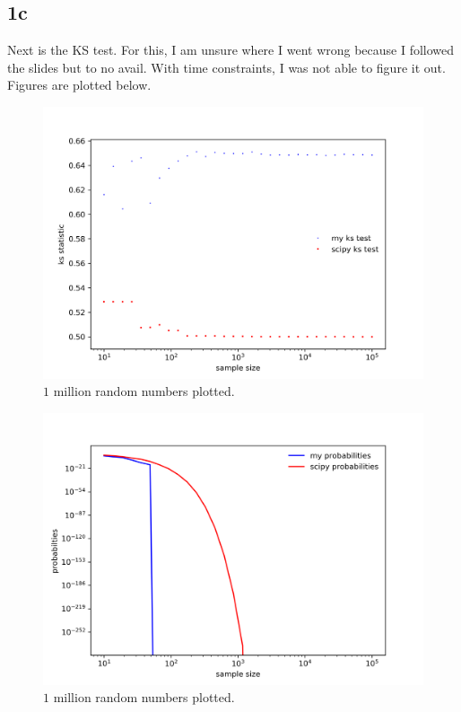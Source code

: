 \subsection{1c}


Next is the KS test. For this, I am unsure where I went wrong because
I followed the slides but to no avail. With time constraints, I was not
able to figure it out. Figures are plotted below.
\begin{figure}[h!]
    \centering
    \includegraphics[width=0.9\linewidth]{./plots/ks_stat.png}
    \caption{$1$ million random numbers plotted.}
    \label{plt3}
\end{figure}

\begin{figure}[h!]
    \centering
    \includegraphics[width=0.9\linewidth]{./plots/ks_prob.png}
    \caption{$1$ million random numbers plotted.}
    \label{plt3}
\end{figure}

